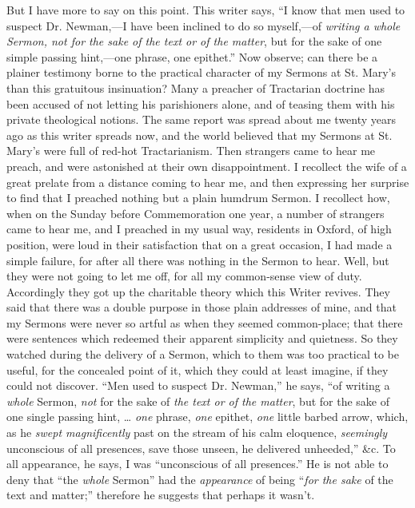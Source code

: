 But I have more to say on this point. This writer says, ``I know that men used to suspect Dr. Newman,—I have been
inclined to do so myself,—of \emph{writing a whole Sermon, not for the
sake of the text or of the matter}, but for the sake of one simple
passing hint,—one phrase, one epithet.'' Now observe; can
there be a plainer testimony borne to the practical character of my
Sermons at St. Mary's than this gratuitous insinuation? Many a preacher
of Tractarian doctrine has been accused of not letting his
parishioners alone, and of teasing them with his private theological
notions. The same report was spread about me twenty
years ago as this writer spreads now, and the world believed that my Sermons at St. Mary's were full of
red-hot Tractarianism. Then strangers came to hear me preach, and were
astonished at their own disappointment. I recollect the wife of a great
prelate from a distance coming to hear me, and then expressing her
surprise to find that I preached nothing but a plain humdrum Sermon. I
recollect how, when on the Sunday before Commemoration one year, a
number of strangers came to hear me, and I preached in my usual way,
residents in Oxford, of high position, were loud in their satisfaction
that on a great occasion, I had made a simple failure, for after all
there was nothing in the Sermon to hear. Well, but they were not going
to let me off, for all my common-sense view of duty. Accordingly they
got up the charitable theory which this Writer revives. They said that
there was a double purpose in those plain addresses of mine, and that my
Sermons were never so artful as when they seemed common-place; that
there were sentences which redeemed their apparent simplicity and
quietness. So they watched during the delivery of a Sermon, which to
them was too practical to be useful, for the concealed point of it,
which they could at least imagine, if they could not discover. ``Men used to suspect Dr. Newman,'' he says, ``of writing
a \emph{whole} Sermon, \emph{not} for the sake of \emph{the text or of the
matter}, but for
the sake of one single passing hint, … \emph{one} phrase, \emph{one}
epithet, \emph{one} little barbed arrow, which, as he \emph{swept magnificently} past
on the stream of his calm eloquence, \emph{seemingly} unconscious of all
presences, save those unseen, he delivered unheeded,'' \&c. To all appearance, he says, I was ``unconscious of all
presences.'' He is not able to deny that ``the \emph{whole}
Sermon'' had the \emph{appearance} of being ``\emph{for the sake}
of the text and matter;'' therefore he suggests that perhaps it
wasn't.

